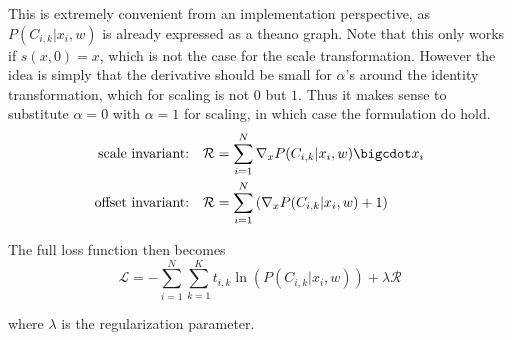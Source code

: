 This is extremely convenient from an implementation perspective, as $P(C_{i, k} | x_i, w)$ is already expressed as a theano graph. Note that this only works if $s(x, 0) = x$, which is not the case for the scale transformation. However the idea is simply that the derivative should be small for $\alpha$'s around the identity transformation, which for scaling is not $0$ but $1$. Thus it makes sense to substitute $\alpha = 0$ with $\alpha = 1$ for scaling, in which case the formulation do hold.
\begin{align}
\text{scale invariant:}&\quad \mathcal{R} = \sum_{i=1}^N \nabla_x P(C_{i, k} | x_i, w)\bigcdot x_i \\
\text{offset invariant:}&\quad \mathcal{R} = \sum_{i=1}^N \left(\nabla_x P(C_{i, k} | x_i, w) + 1\right)
\end{align}

The full loss function then becomes
\begin{equation}
\mathcal{L} = - \sum_{i=1}^N \sum_{k=1}^K t_{i,k} \ln(P(C_{i,k} | x_i, w)) + \lambda \mathcal{R}
\end{equation}

where $\lambda$ is the regularization parameter.
